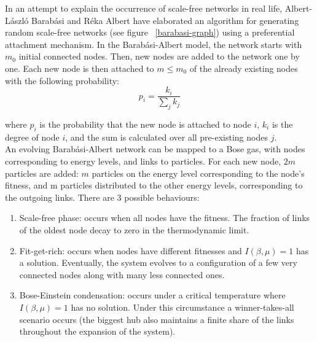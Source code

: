 \documentclass[12pt,openright,twoside]{book}
\begin{document}
In an attempt to explain the occurrence of scale-free networks in real life, Albert-László Barabási and Réka Albert have elaborated an algorithm for generating random scale-free networks (see figure ~\ref{barabasi-graph}) using a preferential attachment mechanism\cite{barabasi_albert_1999}. In the Barabási-Albert model, the network starts with $m_0$ initial connected nodes. Then, new nodes are added to the network one by one. Each new node is then attached to $m \le m_0$ of the already existing nodes with the following probability:\\

\begin{equation}
p_i=\frac{k_i}{\sum_jk_j}
\label{attachment-probability}
\end{equation}

\vspace{14pt}

where $p_i$ is the probability that the new node is attached to node $i$, $k_i$ is the degree of node $i$, and the sum is calculated over all pre-existing nodes $j$.\\

An evolving Barabási-Albert network can be mapped to a Bose gas, with nodes corresponding to energy levels, and links to particles\cite{bianconi_barabasi_2001}. For each new node, $2m$ particles are added: $m$ particles on the energy level corresponding to the node's fitness, and m particles distributed to the other energy levels, corresponding to the outgoing links. There are 3 possible behaviours:\\
\begin{enumerate}
  \item Scale-free phase: occurs when all nodes have the fitness. The fraction of links of the oldest node decay to zero in the thermodynamic limit. 
  \item Fit-get-rich: occurs when nodes have different fitnesses and $I(\beta,\mu)=1$ has a solution. Eventually, the system evolves to a configuration of a few very connected nodes along with many less connected ones. 
  \item Bose-Einstein condensation: occurs under a critical temperature where $I(\beta,\mu)=1$ has no solution. Under this circumstance a winner-takes-all scenario occurs (the biggest hub also maintains a finite share of the links throughout the expansion of the system).
\end{enumerate}

\vspace{14pt}
\end{document}
